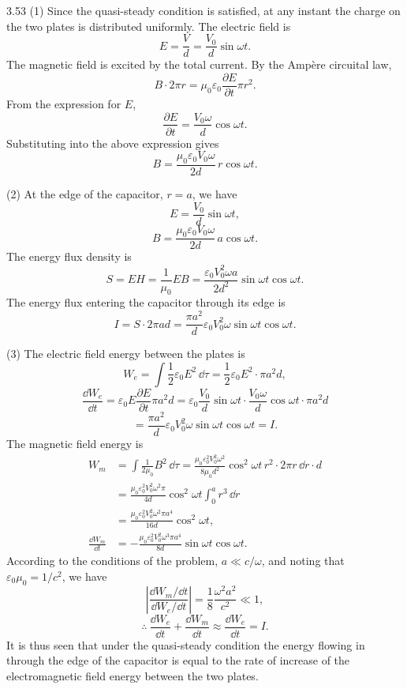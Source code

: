 \begin{solution}{3.53}
(1) Since the quasi-steady condition is satisfied, at any instant the charge on the two plates is distributed uniformly. The electric field is
\[
E=\frac{V}{d}=\frac{V_0}{d}\sin\omega t.
\]
The magnetic field is excited by the total current. By the Amp\`ere circuital law,
\[
B\cdot2\pi r=\mu_0\varepsilon_0\frac{\partial E}{\partial t}\pi r^2.
\]
From the expression for $E$,
\[
\frac{\partial E}{\partial t}=\frac{V_0\omega}{d}\cos\omega t.
\]
Substituting into the above expression gives
\[
B=\frac{\mu_0\varepsilon_0V_0\omega}{2d}\,r\cos\omega t.
\]

(2) At the edge of the capacitor, $r=a$, we have
\[
E=\frac{V_0}{d}\sin\omega t,
\]
\[
B=\frac{\mu_0\varepsilon_0V_0\omega}{2d}\,a\cos\omega t.
\]
The energy flux density is
\[
S=EH=\frac{1}{\mu_0}EB=\frac{\varepsilon_0V_0^2\omega a}{2d^2}\sin\omega t\cos\omega t.
\]
The energy flux entering the capacitor through its edge is
\[
I=S\cdot2\pi ad=\frac{\pi a^2}{d}\varepsilon_0V_0^2\omega\sin\omega t\cos\omega t.
\]

(3) The electric field energy between the plates is
\[
W_e=\int\frac{1}{2}\varepsilon_0E^2\,\dd\tau=\frac{1}{2}\varepsilon_0E^2\cdot\pi a^2d,
\]
\[
\frac{\dd W_e}{\dd t}=\varepsilon_0E\frac{\partial E}{\partial t}\pi a^2d
=\varepsilon_0\frac{V_0}{d}\sin\omega t\cdot\frac{V_0\omega}{d}\cos\omega t\cdot\pi a^2d
\]
\[
=\frac{\pi a^2}{d}\varepsilon_0V_0^2\omega\sin\omega t\cos\omega t
=I.
\]
The magnetic field energy is
\begin{align*}
W_m&=\int\frac{1}{2\mu_0}B^2\,\dd\tau
=\frac{\mu_0\varepsilon_0^2V_0^2\omega^2}{8\mu_0d^2}\cos^2\omega t\,r^2\cdot2\pi r\,\dd r\cdot d\\
&=\frac{\mu_0\varepsilon_0^2V_0^2\omega^2\pi}{4d}\cos^2\omega t\int_0^a r^3\,\dd r\\
&=\frac{\mu_0\varepsilon_0^2V_0^2\omega^2\pi a^4}{16d}\cos^2\omega t,\\
\frac{\dd W_m}{\dd t}&=-\frac{\mu_0\varepsilon_0^2V_0^2\omega^3\pi a^4}{8d}\sin\omega t\cos\omega t.
\end{align*}
According to the conditions of the problem, $a\ll c/\omega$, and noting that $\varepsilon_0\mu_0=1/c^2$, we have
\[
\left|\frac{\dd W_m/\dd t}{\dd W_e/\dd t}\right|
=\frac{1}{8}\frac{\omega^2a^2}{c^2}\ll1,
\]
\[
\therefore\ \frac{\dd W_e}{\dd t}+\frac{\dd W_m}{\dd t}\approx\frac{\dd W_e}{\dd t}=I.
\]
It is thus seen that under the quasi-steady condition the energy flowing in through the edge of the capacitor is equal to the rate of increase of the electromagnetic field energy between the two plates.
\end{solution}

